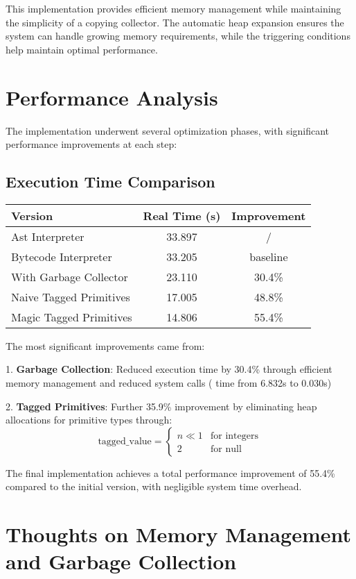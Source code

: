 \documentclass[12pt, a4paper]{article}
\begin{document}
This implementation provides efficient memory management while maintaining the simplicity of a copying collector. The automatic heap expansion ensures the system can handle growing memory requirements, while the triggering conditions help maintain optimal performance.

\section{Performance Analysis}

The implementation underwent several optimization phases, with significant performance improvements at each step:

\subsection{Execution Time Comparison}
\begin{center}
\begin{tabular}{lcc}
\hline
Version & Real Time (s) & Improvement \\
\hline
Ast Interpreter & 33.897 & / \\
Bytecode Interpreter & 33.205 & baseline \\
With Garbage Collector & 23.110 & 30.4\% \\
Naive Tagged Primitives & 17.005 & 48.8\% \\
Magic Tagged Primitives & 14.806 & 55.4\% \\
\hline
\end{tabular}
\end{center}

The most significant improvements came from:

1. \textbf{Garbage Collection}: Reduced execution time by 30.4\% through efficient memory management and reduced system calls ( time from 6.832s to 0.030s)

2. \textbf{Tagged Primitives}: Further 35.9\% improvement by eliminating heap allocations for primitive types through:
   \[
   \text{tagged\_value} = \begin{cases}
   n \ll 1 & \text{for integers} \\
   2 & \text{for null}
   \end{cases}
   \]

The final implementation achieves a total performance improvement of 55.4\% compared to the initial version, with negligible system time overhead.


\section{Thoughts on Memory Management and Garbage Collection}
\end{document}

